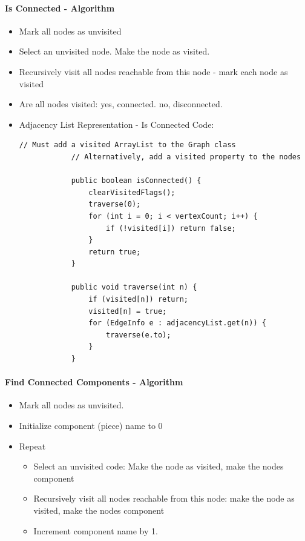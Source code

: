 \documentclass[10pt]{article}
\begin{document}
\paragraph{Is Connected - Algorithm}
\begin{itemize}
    \item Mark all nodes as unvisited
    \item Select an unvisited node. Make the node as visited.
    \item Recursively visit all nodes reachable from this node - mark each node as visited
    \item Are all nodes visited: yes, connected. no, disconnected.
    \item Adjacency List Representation - Is Connected Code:
          \begin{lstlisting}[style=java]
            // Must add a visited ArrayList to the Graph class
            // Alternatively, add a visited property to the nodes
            
            public boolean isConnected() {
                clearVisitedFlags();
                traverse(0);
                for (int i = 0; i < vertexCount; i++) {
                    if (!visited[i]) return false;
                }
                return true;
            }
            
            public void traverse(int n) {
                if (visited[n]) return;
                visited[n] = true;
                for (EdgeInfo e : adjacencyList.get(n)) {
                    traverse(e.to);
                }
            } 
          \end{lstlisting}
\end{itemize}
\paragraph{Find Connected Components - Algorithm}
\begin{itemize}
    \item Mark all nodes as unvisited.
    \item Initialize component (piece) name to 0
    \item Repeat
          \begin{itemize}
              \item Select an unvisited code: Make the node as visited, make the nodes component
              \item Recursively visit all nodes reachable from this node: make the node as visited, make the nodes component
              \item Increment component name by 1.
          \end{itemize}
\end{itemize}
\end{document}
